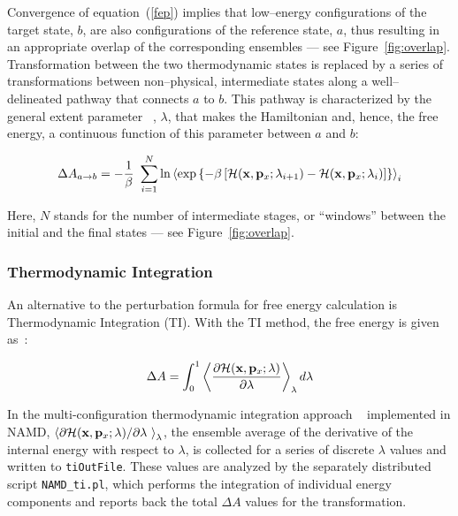 Convergence of equation~({\ref{fep}}) implies that low--energy configurations
of the target state, $b$, are also configurations of the reference state, $a$,
thus resulting in an appropriate overlap of the corresponding ensembles --- see
Figure~\ref{fig:overlap}.  Transformation between the two
thermodynamic states is replaced by a series of transformations between
non--physical, intermediate states along a well--delineated pathway that
connects $a$ to $b$. This pathway is characterized by the general extent
parameter ~\cite{Beveridge1989,King1993,Kirkwood1935,Mark1998}, $\lambda$, that
makes the Hamiltonian and, hence, the free energy, a continuous function of
this parameter between $a$ and $b$:


\begin{equation}
\Delta A_{a \rightarrow b} = -\frac{1}{\beta} \ \sum_{i = 1}^N \ln
                              \left\langle \exp\left\{-\beta
                                               \left[{\cal H}({\bf x}, {\bf p}_x; \lambda_{i+1}) -
                                                     {\cal H}({\bf x}, {\bf p}_x; \lambda_i)
                                               \right]
                                               \right\}
                                               \right\rangle_i
\label{windows}
\end{equation}


Here, $N$ stands for the number of intermediate stages, or ``windows''
between the initial and the final states --- see Figure~\ref{fig:overlap}.


\subsubsection{Thermodynamic Integration }

An alternative to the perturbation formula for free energy calculation is
Thermodynamic Integration (TI). With the TI method, the free energy is given
as~\cite{Kirkwood1935,Straatsma1991,Frenkel2002}:


\begin{equation}
\Delta A =  \int_0^1 \left<\frac{\partial
{\cal H}({\bf x}, {\bf p}_x; \lambda)}{\partial \lambda}\right>_\lambda d\lambda
\end{equation}


In the multi-configuration thermodynamic integration approach
~\cite{Straatsma1991} implemented in NAMD, $ \left<\partial {\cal H}({\bf x},
{\bf p}_x; \lambda) / \partial \lambda~\right>_\lambda $, the ensemble average
of the derivative of the internal energy with respect to $\lambda$, is
collected for a series of discrete $\lambda$ values and written to {\tt tiOutFile}. These values are analyzed by the separately distributed script
{\tt NAMD\_ti.pl}, which performs the integration of individual energy
components and reports back the total $\Delta A$ values for the transformation.



